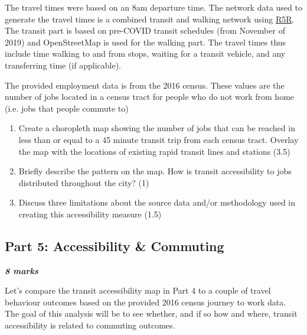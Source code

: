 \documentclass[11pt]{article}
\begin{document}
	The travel times were based on an 8am departure time. The network data used to generate the travel times is a combined transit and walking network using \href{url}{R5R}. The transit part is based on pre-COVID transit schedules (from November of 2019) and OpenStreetMap is used for the walking part. The travel times thus include time walking to and from stops, waiting for a transit vehicle, and any transferring time (if applicable). 
	
	The provided employment data is from the 2016 census. These values are the number of jobs located in a census tract for people who do not work from home (i.e. jobs that people commute to)
	
	
	
	\begin{enumerate}
		\item Create a choropleth map showing the number of jobs that can be reached in less than or equal to a 45 minute transit trip from each census tract. Overlay the map with the locations of existing rapid transit lines and stations (3.5)
		
		\item Briefly describe the pattern on the map. How is transit accessibility to jobs distributed throughout the city? (1)
		
		\item Discuss three limitations about the source data and/or methodology used in creating this accessibility measure (1.5)
		
	\end{enumerate}
	
	
	
	
	
	
	
	\subsection*{Part 5: Accessibility \& Commuting}
	
	\textbf{\textit{8 marks}}
	
	Let's compare the transit accessibility map in Part 4 to a couple of travel behaviour outcomes based on the provided 2016 census journey to work data. The goal of this analysis will be to see whether, and if so how and where, transit accessibility is related to commuting outcomes.
	
\end{document}
